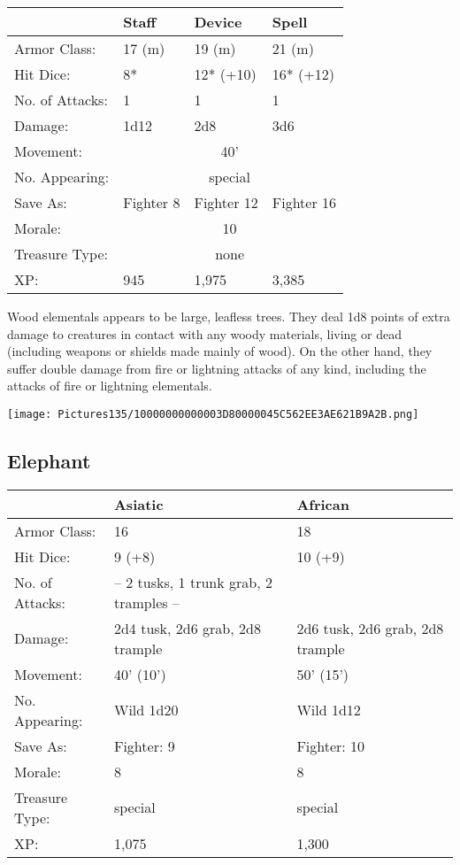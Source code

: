 \documentclass[a4paper,twoside,openany,10pt]{book}
\begin{document}
\begin{multicols}{2}
\begin{tabularx}{0.48\textwidth}{@{}lllX@{}}
& Staff & Device & Spell \\\hline
Armor Class: & 17 (m) & 19 (m) & 21 (m) \\\hline
Hit Dice: & 8* & 12* (+10) & 16* (+12) \\\hline
No. of Attacks: & 1 & 1 & 1 \\\hline
Damage: & 1d12 & 2d8 & 3d6 \\\hline
Movement:  & \multicolumn{3}{c}{40'}\\\hline
No. Appearing: &\multicolumn{3}{c}{special} \\\hline
Save As: & Fighter 8 & Fighter 12 & Fighter 16 \\\hline
Morale: & \multicolumn{3}{c}{10} \\\hline
Treasure Type: & \multicolumn{3}{c}{none} \\\hline
XP: & 945 & 1,975 & 3,385 \\\hline
\end{tabularx}\medskip

Wood elementals appears to be large, leafless trees. They deal 1d8 points of extra damage to creatures in contact with any woody materials, living or dead (including weapons or shields made mainly of wood). On the other hand, they suffer double damage from fire or lightning attacks of any kind, including the attacks of fire or lightning elementals.\\

\begin{center}
	\texttt{[image: Pictures135/10000000000003D80000045C562EE3AE621B9A2B.png]}

\end{center}


\subsection*{Elephant}\label{elephant}

\begin{tabularx}{0.48\textwidth}{@{}lXX@{}}
& Asiatic & African \\\hline
Armor Class: & 16 & 18 \\\hline
Hit Dice: & 9 (+8) & 10 (+9) \\\hline
No. of Attacks: & -- 2 tusks, 1 trunk grab, 2 tramples -- & \\\hline
Damage: & 2d4 tusk, 2d6 grab, 2d8 trample & 2d6 tusk, 2d6 grab, 2d8 trample \\\hline
Movement: & 40' (10') & 50' (15') \\\hline
No. Appearing: & Wild 1d20 & Wild 1d12 \\\hline
Save As: & Fighter: 9 & Fighter: 10 \\\hline
Morale: & 8 & 8 \\\hline
Treasure Type: & special & special \\\hline
XP: & 1,075 & 1,300 \\\hline
\end{tabularx}\medskip


\end{multicols}
\end{document}
